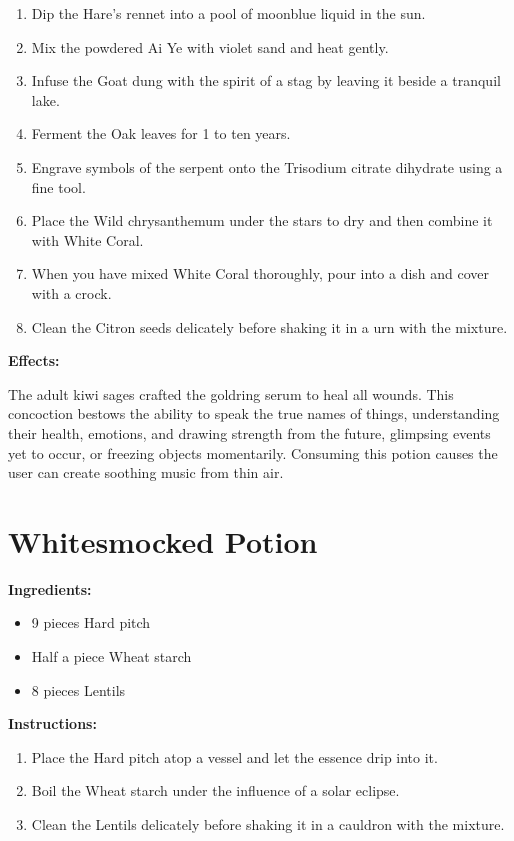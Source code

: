 \documentclass{article}
\begin{document}
\begin{enumerate}
  \item Dip the Hare's rennet into a pool of moonblue liquid in the sun.
  \item Mix the powdered Ai Ye with violet sand and heat gently.
  \item Infuse the Goat dung with the spirit of a stag by leaving it beside a tranquil lake.
  \item Ferment the Oak leaves for 1 to ten years.
  \item Engrave symbols of the serpent onto the Trisodium citrate dihydrate using a fine tool.
  \item Place the Wild chrysanthemum under the stars to dry and then combine it with White Coral.
  \item When you have mixed White Coral thoroughly, pour into a dish and cover with a crock.
  \item Clean the Citron seeds delicately before shaking it in a urn with the mixture.
\end{enumerate}

\textbf{Effects:}

The adult kiwi sages crafted the goldring serum to heal all wounds. This concoction bestows the ability to speak the true names of things, understanding their health, emotions, and drawing strength from the future, glimpsing events yet to occur, or freezing objects momentarily. Consuming this potion causes the user can create soothing music from thin air.

\newpage
\section*{Whitesmocked Potion}

\textbf{Ingredients:}

\begin{itemize}
  \item 9 pieces Hard pitch
  \item Half a piece Wheat starch
  \item 8 pieces Lentils
\end{itemize}

\textbf{Instructions:}

\begin{enumerate}
  \item Place the Hard pitch atop a vessel and let the essence drip into it.
  \item Boil the Wheat starch under the influence of a solar eclipse.
  \item Clean the Lentils delicately before shaking it in a cauldron with the mixture.
\end{enumerate}
\end{document}
